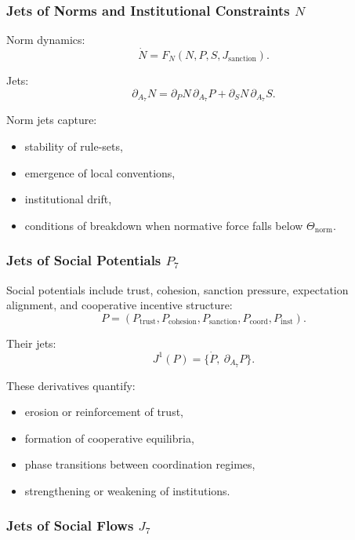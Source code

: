 \subsubsection{Jets of Norms and Institutional Constraints \texorpdfstring{$N$}{N}}

Norm dynamics:
\[
\dot{N} = F_N(N,P,S,J_{\mathrm{sanction}}).
\]

Jets:
\[
\partial_{A_7}N
=
\partial_P N\, \partial_{A_7}P
+
\partial_S N\, \partial_{A_7}S.
\]

Norm jets capture:
\begin{itemize}
    \item stability of rule-sets,
    \item emergence of local conventions,
    \item institutional drift,
    \item conditions of breakdown when normative force falls below
          $\Theta_{\mathrm{norm}}$.
\end{itemize}


\subsubsection{Jets of Social Potentials \texorpdfstring{$P_7$}{P_7}}

Social potentials include trust, cohesion, sanction pressure, expectation
alignment, and cooperative incentive structure:
\[
P = (P_{\mathrm{trust}}, P_{\mathrm{cohesion}}, P_{\mathrm{sanction}},
P_{\mathrm{coord}}, P_{\mathrm{inst}}).
\]

Their jets:
\[
J^1(P)=\{\dot{P},\ \partial_{A_7}P\}.
\]

These derivatives quantify:
\begin{itemize}
    \item erosion or reinforcement of trust,
    \item formation of cooperative equilibria,
    \item phase transitions between coordination regimes,
    \item strengthening or weakening of institutions.
\end{itemize}


\subsubsection{Jets of Social Flows \texorpdfstring{$J_7$}{J_7}}

